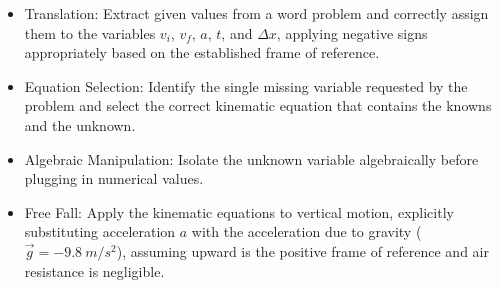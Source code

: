 \documentclass[]{article}
\begin{document}
\begin{itemize}[itemsep=0pt,topsep=0pt]
    \item  Translation: Extract given values from a word problem and correctly assign them to the variables $v_i$, $v_f$, $a$, $t$, and $\Delta x$, applying negative signs appropriately based on the established frame of reference.
    \item Equation Selection: Identify the single missing variable requested by the problem and select the correct kinematic equation that contains the knowns and the unknown.
    \item Algebraic Manipulation: Isolate the unknown variable algebraically before plugging in numerical values.
    \item Free Fall: Apply the kinematic equations to vertical motion, explicitly substituting acceleration $a$ with the acceleration due to gravity ($\vec{g} = -\SI{9.8}{m/s^2}$), assuming upward is the positive frame of reference and air resistance is negligible.
\end{itemize}



\end{document}
